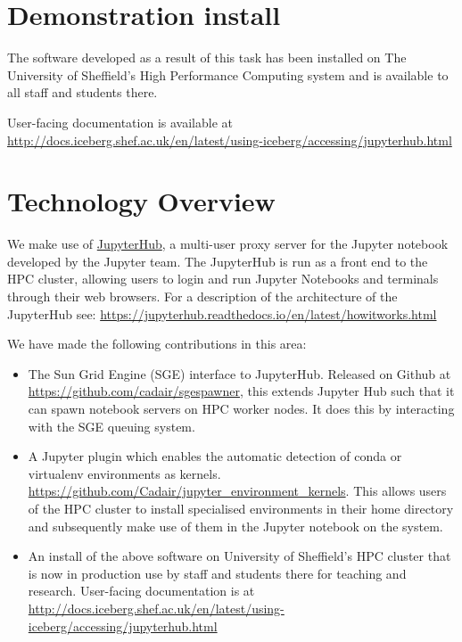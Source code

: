 \documentclass{deliverablereport}
\author{Stuart Mumford, Neil Lawrence \& Mike Croucher}
\begin{document}
\maketitle
\githubissuedescription
\tableofcontents\newpage

\section{Demonstration install}

The software developed as a result of this task has been installed on The University of Sheffield's High Performance Computing system and is available to all staff and students there. 

User-facing documentation is available at \url{http://docs.iceberg.shef.ac.uk/en/latest/using-iceberg/accessing/jupyterhub.html}

\section{Technology Overview}

We make use of \href{https://github.com/jupyterhub/jupyterhub}{JupyterHub}, a multi-user proxy server for the Jupyter notebook developed by the Jupyter team.
The JupyterHub is run as a front end to the HPC cluster, allowing users to login and run Jupyter Notebooks and terminals through their web browsers. For a description of the architecture of the JupyterHub see: \url{https://jupyterhub.readthedocs.io/en/latest/howitworks.html}

We have made the following contributions in this area:

\begin{itemize}
\item The Sun Grid Engine (SGE) interface to JupyterHub. Released on Github at \url{https://github.com/cadair/sgespawner}, this extends Jupyter Hub such that it can spawn notebook servers on HPC worker nodes. It does this by interacting with the SGE queuing system.
\item A Jupyter plugin which enables the automatic detection of conda or virtualenv environments as kernels. \url{https://github.com/Cadair/jupyter_environment_kernels}. This allows users of the HPC cluster to install specialised environments in their home directory and subsequently make use of them in the Jupyter notebook on the system.
\item An install of the above software on University of Sheffield's HPC cluster that is now in production use by staff and students there for teaching and research. User-facing documentation is at \url{http://docs.iceberg.shef.ac.uk/en/latest/using-iceberg/accessing/jupyterhub.html}
\end{itemize}
\end{document}
